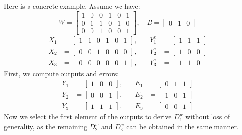 \documentclass[pmlr]{jmlr}
\begin{document}
Here is a concrete example. Assume we have:
\[
    W = \begin{bmatrix}
        1 & 0 & 0 & 1 & 0 & 1 \\
        0 & 1 & 1 & 0 & 1 & 0 \\
        0 & 0 & 1 & 0 & 0 & 1
    \end{bmatrix}, \quad
    B = \begin{bmatrix} 0 & 1 & 0 \end{bmatrix}
\]
\[
    \begin{aligned}
        X_1 & = \begin{bmatrix} 1 & 1 & 0 & 1 & 0 & 1 \end{bmatrix}, \\
        X_2 & = \begin{bmatrix} 0 & 0 & 1 & 0 & 0 & 0 \end{bmatrix}, \\
        X_3 & = \begin{bmatrix} 0 & 0 & 0 & 0 & 0 & 1 \end{bmatrix},
    \end{aligned} \quad
    \begin{aligned}
        Y^e_1 & = \begin{bmatrix} 1 & 1 & 1 \end{bmatrix} \\
        Y^e_2 & = \begin{bmatrix} 1 & 0 & 0 \end{bmatrix} \\
        Y^e_3 & = \begin{bmatrix} 1 & 1 & 0 \end{bmatrix}
    \end{aligned}
\]
First, we compute outputs and errors:
\[
    \begin{aligned}
        Y_1 & = \begin{bmatrix} 1 & 0 & 0 \end{bmatrix}, \\
        Y_2 & = \begin{bmatrix} 0 & 0 & 1 \end{bmatrix}, \\
        Y_3 & = \begin{bmatrix} 1 & 1 & 1 \end{bmatrix},
    \end{aligned} \quad
    \begin{aligned}
        E_1 & = \begin{bmatrix} 0 & 1 & 1 \end{bmatrix} \\
        E_2 & = \begin{bmatrix} 1 & 0 & 1 \end{bmatrix} \\
        E_3 & = \begin{bmatrix} 0 & 0 & 1 \end{bmatrix}
    \end{aligned}
\]
Now we select the first element of the outputs to derive \( D^w_1 \) without loss of generality, as the remaining \( D^w_2 \) and \( D^w_3 \) can be obtained in the same manner.
\end{document}
